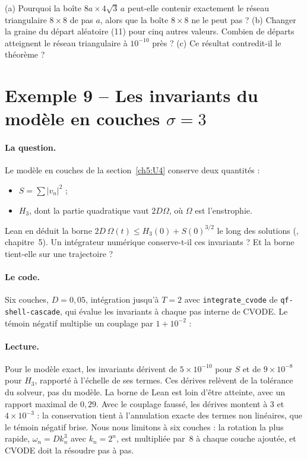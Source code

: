 \begin{exercise}[Exemple 8]\label{appF:exo8}
(a) Pourquoi la boîte $8a\times4\sqrt3\,a$ peut-elle contenir exactement le réseau triangulaire $8\times8$ de pas $a$,
alors que la boîte $8\times8$ ne le peut pas ? (b) Changer la graine du départ aléatoire (11) pour cinq autres valeurs.
Combien de départs atteignent le réseau triangulaire à $10^{-10}$ près ? (c) Ce résultat contredit-il le théorème ?
\end{exercise}

\section{Exemple 9 -- Les invariants du modèle en couches \texorpdfstring{$\sigma=3$}{sigma=3}}\label{appF:ex9}

\paragraph{La question.} Le modèle en couches de la section~\ref{ch5:U4} conserve deux quantités :
\begin{itemize}
\item $S=\sum|v_n|^2$ ;
\item $H_3$, dont la partie quadratique vaut $2D\Omega$, où $\Omega$ est l'enstrophie.
\end{itemize}
Lean en déduit la borne $2D\,\Omega(t)\le H_3(0)+S(0)^{3/2}$ le long des solutions (\tierAs, chapitre~5). Un
intégrateur numérique conserve-t-il ces invariants ? Et la borne tient-elle sur une trajectoire ?

\paragraph{Le code.} Six couches, $D=0{,}05$, intégration jusqu'à $T=2$ avec \texttt{integrate\_cvode} de
\texttt{qf-shell-cascade}, qui évalue les invariants à chaque pas interne de CVODE. Le témoin négatif multiplie un
couplage par $1+10^{-2}$ :


\paragraph{Lecture.} Pour le modèle exact, les invariants dérivent de $5\times10^{-10}$ pour $S$ et de $9\times10^{-8}$ pour
$H_3$, rapporté à l'échelle de ses termes. Ces dérives relèvent de la tolérance du solveur, pas du modèle. La borne de
Lean est loin d'être atteinte, avec un rapport maximal de $0{,}29$. Avec le couplage faussé, les dérives montent à
$3$ et $4\times10^{-3}$ : la conservation tient à l'annulation exacte des termes non linéaires, que le témoin négatif brise.
Nous nous limitons à six couches : la rotation la plus rapide, $\omega_n=Dk_n^3$ avec $k_n=2^n$, est multipliée par~8 à
chaque couche ajoutée, et CVODE doit la résoudre pas à pas.

